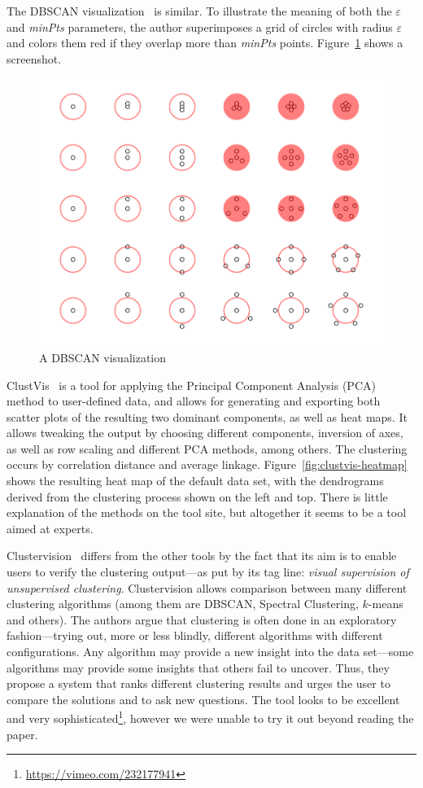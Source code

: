 \documentclass{vgtc} %
\begin{document}
The DBSCAN visualization~\cite{dbscan} is similar. To illustrate the meaning of
both the $\varepsilon$ and \emph{minPts} parameters, the author superimposes a
grid of circles with radius $\varepsilon$ and colors them red if they overlap
more than \emph{minPts} points. Figure~\ref{fig:dbscan} shows a screenshot.

\begin{figure}[tb]
    \centering
    \includegraphics[width=0.7\columnwidth]{dbscan}
    \caption{A DBSCAN visualization}
    \label{fig:dbscan}
\end{figure}

ClustVis~\cite{clustvis} is a tool for applying the Principal Component Analysis (PCA) method
to user-defined data, and allows for generating and exporting both scatter plots
of the resulting two dominant components, as well as heat maps. It allows tweaking
the output by choosing different components, inversion of axes, as well as row scaling
and different PCA methods, among others. The clustering occurs by correlation distance
and average linkage. Figure~\ref{fig:clustvis-heatmap} shows the resulting heat map of
the default data set, with the dendrograms derived from the clustering process shown
on the left and top. There is little explanation of the methods on the tool site, but
altogether it seems to be a tool aimed at experts.

Clustervision~\cite{clustervision} differs from the other tools by the fact
that its aim is to enable users to verify the clustering output---as put by its
tag line: \emph{visual supervision of unsupervised clustering}. Clustervision
allows comparison between many different clustering algorithms (among them are
DBSCAN, Spectral Clustering, $k$-means and others). The authors argue that
clustering is often done in an exploratory fashion---trying out, more or less
blindly, different algorithms with different configurations. Any algorithm may
provide a new insight into the data set---some algorithms may provide some
insights that others fail to uncover. Thus, they propose a system that ranks
different clustering results and urges the user to compare the solutions and to
ask new questions. The tool looks to be excellent and very
sophisticated\footnote{\url{https://vimeo.com/232177941}}, however we were unable to
try it out beyond reading the paper.
\end{document}
